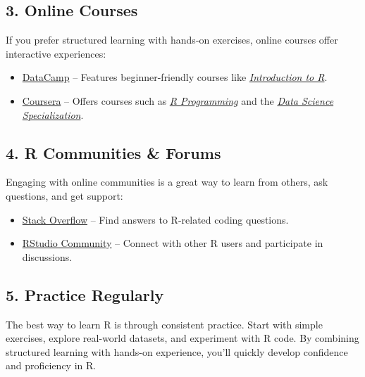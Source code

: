 \documentclass[
]{book}
\providecommand{\tightlist}{%
  \setlength{\itemsep}{0pt}\setlength{\parskip}{0pt}}
\theoremstyle{definition}
\theoremstyle{definition}
\theoremstyle{definition}
\theoremstyle{definition}
\theoremstyle{remark}
\begin{document}
\subsection*{3. Online Courses}\label{online-courses}

If you prefer structured learning with hands-on exercises, online courses offer interactive experiences:

\begin{itemize}
\tightlist
\item
  \href{https://www.datacamp.com}{DataCamp} -- Features beginner-friendly courses like \href{https://learn.datacamp.com/courses/free-introduction-to-r}{\emph{Introduction to R}}.\\
\item
  \href{https://www.coursera.org}{Coursera} -- Offers courses such as \href{https://www.coursera.org/learn/r-programming}{\emph{R Programming}} and the \href{https://www.coursera.org/specializations/jhu-data-science}{\emph{Data Science Specialization}}.
\end{itemize}

\subsection*{4. R Communities \& Forums}\label{r-communities-forums}

Engaging with online communities is a great way to learn from others, ask questions, and get support:

\begin{itemize}
\tightlist
\item
  \href{https://stackoverflow.com/questions/tagged/r}{Stack Overflow} -- Find answers to R-related coding questions.\\
\item
  \href{https://community.rstudio.com/}{RStudio Community} -- Connect with other R users and participate in discussions.
\end{itemize}

\subsection*{5. Practice Regularly}\label{practice-regularly}

The best way to learn R is through consistent practice. Start with simple exercises, explore real-world datasets, and experiment with R code. By combining structured learning with hands-on experience, you'll quickly develop confidence and proficiency in R.
\end{document}
